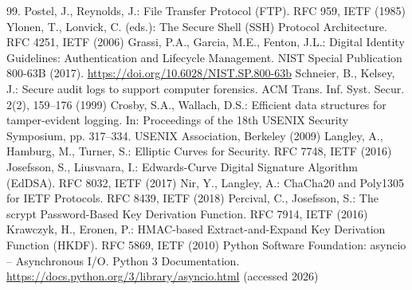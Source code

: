 \documentclass[graybox]{svmult}
\begin{document}
\begin{thebibliography}{99.}
 Postel, J., Reynolds, J.: File Transfer Protocol (FTP). RFC 959, IETF (1985)
 Ylonen, T., Lonvick, C. (eds.): The Secure Shell (SSH) Protocol Architecture. RFC 4251, IETF (2006)
 Grassi, P.A., Garcia, M.E., Fenton, J.L.: Digital Identity Guidelines: Authentication and Lifecycle Management. NIST Special Publication 800-63B (2017). \url{https://doi.org/10.6028/NIST.SP.800-63b}
 Schneier, B., Kelsey, J.: Secure audit logs to support computer forensics. ACM Trans. Inf. Syst. Secur. 2(2), 159--176 (1999)
 Crosby, S.A., Wallach, D.S.: Efficient data structures for tamper-evident logging. In: Proceedings of the 18th USENIX Security Symposium, pp. 317--334. USENIX Association, Berkeley (2009)
 Langley, A., Hamburg, M., Turner, S.: Elliptic Curves for Security. RFC 7748, IETF (2016)
 Josefsson, S., Liusvaara, I.: Edwards-Curve Digital Signature Algorithm (EdDSA). RFC 8032, IETF (2017)
 Nir, Y., Langley, A.: ChaCha20 and Poly1305 for IETF Protocols. RFC 8439, IETF (2018)
 Percival, C., Josefsson, S.: The scrypt Password-Based Key Derivation Function. RFC 7914, IETF (2016)
 Krawczyk, H., Eronen, P.: HMAC-based Extract-and-Expand Key Derivation Function (HKDF). RFC 5869, IETF (2010)
 Python Software Foundation: asyncio -- Asynchronous I/O. Python 3 Documentation. \url{https://docs.python.org/3/library/asyncio.html} (accessed 2026)
\end{thebibliography}
\end{document}
